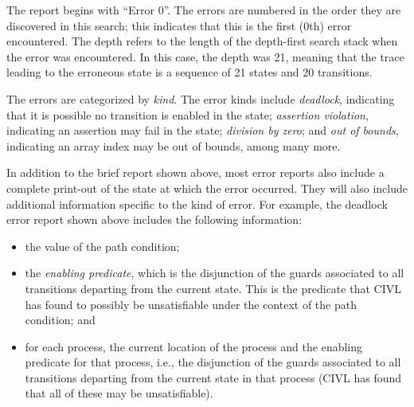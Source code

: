 The report begins with ``Error 0''.  The errors are numbered in the
order they are discovered in this search; this indicates that this is
the first (0th) error encountered.  The depth refers to the length of
the depth-first search stack when the error was encountered.  In this
case, the depth was 21, meaning that the trace leading to the
erroneous state is a sequence of 21 states and 20 transitions.

The errors are categorized by \emph{kind}.  The error kinds include
\emph{deadlock}, indicating that it is possible no transition is
enabled in the state; \emph{assertion violation}, indicating an
assertion may fail in the state; \emph{division by zero}; and
\emph{out of bounds}, indicating an array index may be out of bounds,
among many more.

In addition to the brief report shown above, most error reports
also include a complete print-out of the state at which the error
occurred.  They will also include additional information specific
to the kind of error.  For example, the deadlock error report shown
above includes the following information:
\begin{itemize}
\item the value of the path condition;
\item the \emph{enabling predicate}, which is the disjunction of the
  guards associated to all transitions departing from the current
  state. This is the predicate that CIVL has found to possibly be
  unsatisfiable under the context of the path condition; and
\item for each process, the current location of the process and the
  enabling predicate for that process, i.e., the disjunction of the
  guards associated to all transitions departing from the current
  state in that process (CIVL has found that all of these may be
  unsatisfiable).
\end{itemize}

